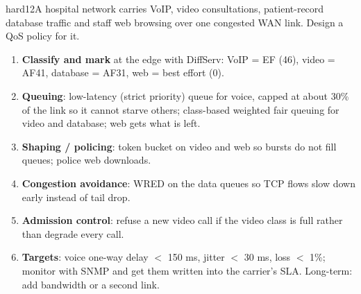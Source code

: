 \documentclass[10pt]{article}
\begin{document}
\begin{practice}{hard}{12}A hospital network carries VoIP, video consultations, patient-record database traffic and staff web browsing over one congested WAN link. Design a QoS policy for it.
\sol
\begin{enumerate}
\item \textbf{Classify and mark} at the edge with DiffServ: VoIP = EF (46), video = AF41, database = AF31, web = best effort (0).
\item \textbf{Queuing}: low-latency (strict priority) queue for voice, capped at about 30\% of the link so it cannot starve others; class-based weighted fair queuing for video and database; web gets what is left.
\item \textbf{Shaping / policing}: token bucket on video and web so bursts do not fill queues; police web downloads.
\item \textbf{Congestion avoidance}: WRED on the data queues so TCP flows slow down early instead of tail drop.
\item \textbf{Admission control}: refuse a new video call if the video class is full rather than degrade every call.
\item \textbf{Targets}: voice one-way delay $<$ 150 ms, jitter $<$ 30 ms, loss $<$ 1\%; monitor with SNMP and get them written into the carrier's SLA. Long-term: add bandwidth or a second link.
\end{enumerate}
\end{practice}
\end{document}
